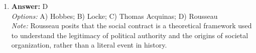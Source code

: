 \documentclass[12pt]{article}
\begin{document}
\begin{enumerate}[label=\arabic*.]
\\ \textit{Options:} A) The language of the law is generally unclear.; B) Lawyers' arguments usually concern language.; C) Judges are prey to linguistic misunderstanding.; D) The rule of recognition cannot fully account for legal validity.
\\ \textit{Note:} Dworkin's 'semantic sting' argues that the rule of recognition alone fails to capture the complexities of legal interpretation and the moral dimensions that influence the determination of legal validity.
\item \textbf{Answer:} D
\\ \textit{Options:} A) Hobbes; B) Locke; C) Thomas Acquinas; D) Rousseau
\\ \textit{Note:} Rousseau posits that the social contract is a theoretical framework used to understand the legitimacy of political authority and the origins of societal organization, rather than a literal event in history.
\end{enumerate}
\end{document}
